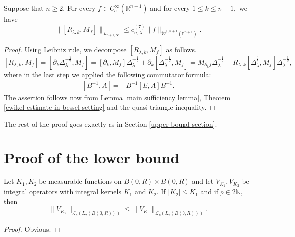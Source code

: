 \documentclass{amsart}
\begin{document}
\begin{lemma}\label{final sufficiency lemma} Suppose that $n\geq 2.$ For every $f\in C^{\infty}_c(\mathbb{R}^{n+1})$ and for every $1\leq k\leq n+1,$ we have
$$\|[R_{\lambda,k},M_f]\|_{\mathcal{L}_{n+1,\infty}}\leq c_{n,\lambda}^{(7)}\|f\|_{\dot{W}^{1,n+1}(\mathbb{R}_+^{n+1})}.$$
\end{lemma}
\begin{proof} Using Leibniz rule, we decompose $[R_{\lambda,k},M_f]$ as follows.
$$[R_{\lambda,k},M_f]=[\partial_k\Delta_\lambda^{-\frac12},M_f]=[\partial_k,M_f]\Delta_\lambda^{-\frac12}+\partial_k[\Delta_\lambda^{-\frac12},M_f]=M_{\partial_k f}\Delta_\lambda^{-\frac12}-R_{\lambda,k}[\Delta_\lambda^{\frac12},M_f]\Delta_\lambda^{-\frac12},$$
where in the last step we applied the following commutator formula:
\begin{align}\label{commutator}
[B^{-1},A]=-B^{-1}[B,A]B^{-1}.
\end{align}
The assertion follows now from Lemma \ref{main sufficiency lemma}, Theorem \ref{cwikel estimate in bessel setting} and the quasi-triangle inequality.
\end{proof}

The rest of the proof goes exactly as in Section \ref{upper bound section}.

\section{Proof of the lower bound}
\setcounter{equation}{0}

\begin{lemma}\label{positive schur lemma} Let $K_1,K_2$ be measurable functions on $B(0,R)\times B(0,R)$ and let $V_{K_1},V_{K_2}$ be integral operators with integral kernels $K_1$ and $K_2.$ If $|K_2|\leq K_1$ and if $p\in2\mathbb{N},$ then
$$\|V_{K_2}\|_{\mathcal{L}_p(L_2(B(0,R)))}\leq\|V_{K_1}\|_{\mathcal{L}_p(L_2(B(0,R)))}.$$
\end{lemma}
\begin{proof} Obvious.
\end{proof}
\end{document}
